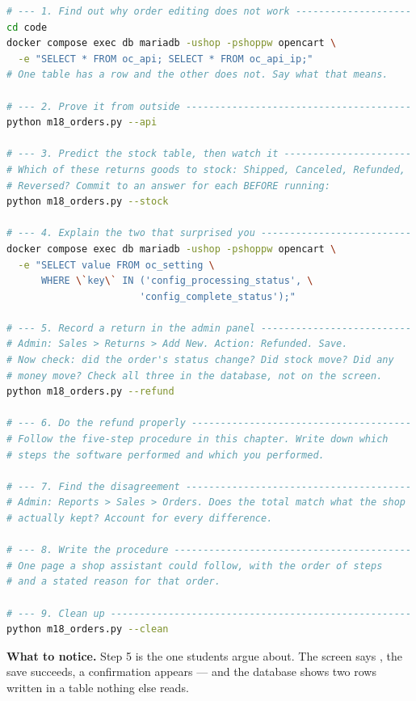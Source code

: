 \begin{lab}
\begin{lstlisting}[language=bash]
# --- 1. Find out why order editing does not work --------------------
cd code
docker compose exec db mariadb -ushop -pshoppw opencart \
  -e "SELECT * FROM oc_api; SELECT * FROM oc_api_ip;"
# One table has a row and the other does not. Say what that means.

# --- 2. Prove it from outside ---------------------------------------
python m18_orders.py --api

# --- 3. Predict the stock table, then watch it ----------------------
# Which of these returns goods to stock: Shipped, Canceled, Refunded,
# Reversed? Commit to an answer for each BEFORE running:
python m18_orders.py --stock

# --- 4. Explain the two that surprised you --------------------------
docker compose exec db mariadb -ushop -pshoppw opencart \
  -e "SELECT value FROM oc_setting \
      WHERE \`key\` IN ('config_processing_status', \
                       'config_complete_status');"

# --- 5. Record a return in the admin panel --------------------------
# Admin: Sales > Returns > Add New. Action: Refunded. Save.
# Now check: did the order's status change? Did stock move? Did any
# money move? Check all three in the database, not on the screen.
python m18_orders.py --refund

# --- 6. Do the refund properly --------------------------------------
# Follow the five-step procedure in this chapter. Write down which
# steps the software performed and which you performed.

# --- 7. Find the disagreement ---------------------------------------
# Admin: Reports > Sales > Orders. Does the total match what the shop
# actually kept? Account for every difference.

# --- 8. Write the procedure -----------------------------------------
# One page a shop assistant could follow, with the order of steps
# and a stated reason for that order.

# --- 9. Clean up ----------------------------------------------------
python m18_orders.py --clean
\end{lstlisting}

\smallskip
\textbf{What to notice.} Step 5 is the one students argue about. The screen says
\uiel{Refunded}, the save succeeds, a confirmation appears --- and the database
shows two rows written in a table nothing else reads.
\end{lab}

